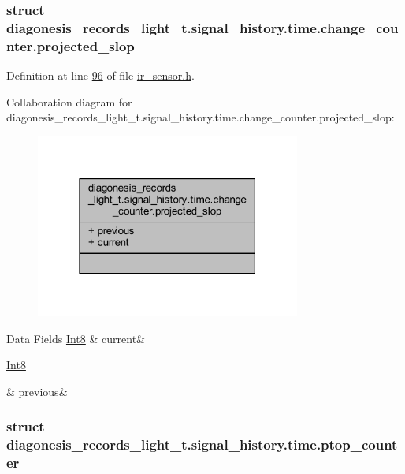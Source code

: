 \subsubsection{struct diagonesis\+\_\+records\+\_\+light\+\_\+t.\+signal\+\_\+history.\+time.\+change\+\_\+counter.\+projected\+\_\+slop}


Definition at line \hyperlink{a00017_source_l00096}{96} of file \hyperlink{a00017_source}{ir\+\_\+sensor.\+h}.



Collaboration diagram for diagonesis\+\_\+records\+\_\+light\+\_\+t.\+signal\+\_\+history.\+time.\+change\+\_\+counter.\+projected\+\_\+slop\+:\nopagebreak
\begin{figure}[H]
\begin{center}
\leavevmode
\includegraphics[width=247pt]{dc/d36/a00925}
\end{center}
\end{figure}
\begin{DoxyFields}{Data Fields}
\hypertarget{a00017_a43b5c9175984c071f30b873fdce0a000}{\hyperlink{a00072_a7e31ca7716b8d85dd473450a5c5e5a97}{Int8}}\label{a00017_a43b5c9175984c071f30b873fdce0a000}
&
current&
\\
\hline

\hypertarget{a00017_a2327346e833efcd6b2e7b3f0a4df8ebb}{\hyperlink{a00072_a7e31ca7716b8d85dd473450a5c5e5a97}{Int8}}\label{a00017_a2327346e833efcd6b2e7b3f0a4df8ebb}
&
previous&
\\
\hline

\end{DoxyFields}
\label{db/db9/a00387}
\hypertarget{a00017_db/db9/a00387}{}
\subsubsection{struct diagonesis\+\_\+records\+\_\+light\+\_\+t.\+signal\+\_\+history.\+time.\+ptop\+\_\+counter}


